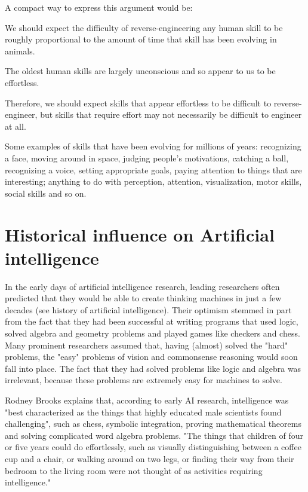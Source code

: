 \documentclass[10pt,a4paper,twoside]{article}
\begin{document}
A compact way to express this argument would be:

We should expect the difficulty of reverse-engineering any human skill to be roughly proportional to the amount of time that skill has been evolving in animals.

The oldest human skills are largely unconscious and so appear to us to be effortless.

Therefore, we should expect skills that appear effortless to be difficult to reverse-engineer, but skills that require effort may not necessarily be difficult to engineer at all.

Some examples of skills that have been evolving for millions of years: recognizing a face, moving around in space, judging people's motivations, catching a ball, recognizing a voice, setting appropriate goals, paying attention to things that are interesting; anything to do with perception, attention, visualization, motor skills, social skills and so on.


\section{Historical influence on Artificial intelligence}

In the early days of artificial intelligence research, leading researchers often predicted that they would be able to create thinking machines in just a few decades (see history of artificial intelligence). Their optimism stemmed in part from the fact that they had been successful at writing programs that used logic, solved algebra and geometry problems and played games like checkers and chess. Many prominent researchers assumed that, having (almost) solved the "hard" problems, the "easy" problems of vision and commonsense reasoning would soon fall into place. The fact that they had solved problems like logic and algebra was irrelevant, because these problems are extremely easy for machines to solve.

Rodney Brooks explains that, according to early AI research, intelligence was "best characterized as the things that highly educated male scientists found challenging", such as chess, symbolic integration, proving mathematical theorems and solving complicated word algebra problems. "The things that children of four or five years could do effortlessly, such as visually distinguishing between a coffee cup and a chair, or walking around on two legs, or finding their way from their bedroom to the living room were not thought of as activities requiring intelligence."


 



 
\end{document}
